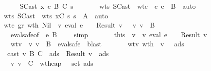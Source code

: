 \begin{isabellebody}
\ \ \ \ \isamarkupfalse \isanewline
\ \ \ \ \ \ \isamarkupfalse \ {\isacharparenleft}SCast\ x\ e\ B\ C\ s{\isacharprime}{\isacharparenright}\isanewline
\ \ \ \ \ \ \isamarkupfalse \ wts\ SCast\ \isamarkupfalse \ wte{\isacharcolon}\ {\isachardoublequoteopen}{\isasymGamma}\ {\isasymturnstile}\isactrlisub e\ e\ {\isacharcolon}\ B{\isachardoublequoteclose}\ \isamarkupfalse \ auto\isanewline
\ \ \ \ \ \ \isamarkupfalse \ wts\ SCast\ \isamarkupfalse \ wts{}{\isacharcolon}\ {\isachardoublequoteopen}{\isacharparenleft}x{\isacharcomma}C{\isacharparenright}{\isacharhash}{\isasymGamma}\ {\isasymturnstile}\isactrlisub s\ s{\isacharprime}\ {\isacharcolon}\ A{\isacharprime}{\isachardoublequoteclose}\ \isamarkupfalse \ auto\isanewline
\ \ \ \ \ \ \isamarkupfalse \ wte\ gr\ wt{\isacharunderscore}h\ Nil\ \isamarkupfalse \ {\isachardoublequoteopen}{\isacharparenleft}{\isasymexists}v{\isachardot}\ eval\ e\ {\isasymrho}\ {\isasymmu}\ {\isacharequal}\ Result\ v\ {\isasymand}\ {\isasymSigma}\ {\isasymturnstile}v\ v\ {\isacharcolon}\ B{\isacharparenright}{\isachardoublequoteclose}\isanewline
\ \ \ \ \ \ \ \ \isamarkupfalse \ eval{\isacharunderscore}safe{\isacharbrackleft}of\ {\isasymGamma}\ e\ B\ {\isasymSigma}\ {\isasymrho}\ {\isasymmu}{\isacharbrackright}\ \isamarkupfalse \ simp\isanewline
\ \ \ \ \ \ \isamarkupfalse \ this\ \isamarkupfalse \ v\ \ v{\isacharcolon}\ {\isachardoublequoteopen}eval\ e\ {\isasymrho}\ {\isasymmu}\ {\isacharequal}\ Result\ v{\isachardoublequoteclose}\isanewline
\ \ \ \ \ \ \ \ \ wtv{\isacharcolon}\ {\isachardoublequoteopen}{\isasymSigma}\ {\isasymturnstile}v\ v\ {\isacharcolon}\ B{\isachardoublequoteclose}\ \isamarkupfalse \ eval{\isacharunderscore}safe\ \isamarkupfalse \ blast\isanewline
\ \ \ \ \ \ \isamarkupfalse \ wtv\ wt{\isacharunderscore}h\ \isamarkupfalse \ {\isachardoublequoteopen}{\isacharparenleft}{\isasymexists}v{\isacharprime}\ {\isasymSigma}{\isacharprime}\ {\isasymmu}{\isacharprime}\ ads{}{\isachardot}\isanewline
\ \ \ \ \ \ \ \ cast\ v\ B\ C\ {\isasymmu}\ ads\ {\isacharequal}\ Result\ {\isacharparenleft}v{\isacharprime}{\isacharcomma}\ {\isasymmu}{\isacharprime}{\isacharcomma}\ ads{}{\isacharparenright}\ {\isasymand}\isanewline
\ \ \ \ \ \ \ \ {\isasymSigma}{\isacharprime}\ {\isasymturnstile}v\ v{\isacharprime}\ {\isacharcolon}\ C\ {\isasymand}\ wt{\isacharunderscore}heap\ {\isasymSigma}{\isacharprime}\ {\isasymmu}{\isacharprime}\ {\isacharparenleft}set\ ads{}{\isacharparenright}\ {\isasymand}\ {\isasymSigma}{\isacharprime}\ {\isasymsqsubseteq}\ {\isasymSigma}{\isacharparenright}\ {\isasymor}\isanewline

\end{isabellebody}
